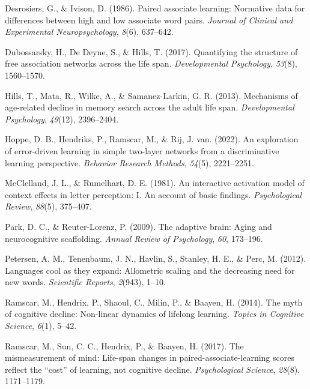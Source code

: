 \documentclass[
  man]{apa6}
\newlength{\cslhangindent}
\newlength{\cslentryspacingunit} %
\newenvironment{CSLReferences}[2] %
 {%
  \setlength{\parindent}{0pt}
  \ifodd #1
  \let\oldpar\par
  \def\par{\hangindent=\cslhangindent\oldpar}
  \fi
  \setlength{\parskip}{#2\cslentryspacingunit}
 }%
 {}
\begin{document}
\begin{CSLReferences}{1}{0}
\leavevmode{}%
Desrosiers, G., \& Ivison, D. (1986). Paired associate learning: Normative data for differences between high and low associate word pairs. \emph{Journal of Clinical and Experimental Neuropsychology}, \emph{8}(6), 637--642.

\leavevmode{}%
Dubossarsky, H., De Deyne, S., \& Hills, T. (2017). Quantifying the structure of free association networks across the life span. \emph{Developmental Psychology}, \emph{53}(8), 1560--1570.

\leavevmode{}%
Hills, T., Mata, R., Wilke, A., \& Samanez-Larkin, G. R. (2013). Mechanisms of age-related decline in memory search across the adult life span. \emph{Developmental Psychology}, \emph{49}(12), 2396--2404.

\leavevmode{}%
Hoppe, D. B., Hendriks, P., Ramscar, M., \& Rij, J. van. (2022). An exploration of error-driven learning in simple two-layer networks from a discriminative learning perspective. \emph{Behavior Research Methods}, \emph{54}(5), 2221--2251.

\leavevmode{}%
McClelland, J. L., \& Rumelhart, D. E. (1981). An interactive activation model of context effects in letter perception: I. An account of basic findings. \emph{Psychological Review}, \emph{88}(5), 375--407.

\leavevmode{}%
Park, D. C., \& Reuter-Lorenz, P. (2009). The adaptive brain: Aging and neurocognitive scaffolding. \emph{Annual Review of Psychology}, \emph{60}, 173--196.

\leavevmode{}%
Petersen, A. M., Tenenbaum, J. N., Havlin, S., Stanley, H. E., \& Perc, M. (2012). Languages cool as they expand: Allometric scaling and the decreasing need for new words. \emph{Scientific Reports}, \emph{2}(943), 1--10.

\leavevmode{}%
Ramscar, M., Hendrix, P., Shaoul, C., Milin, P., \& Baayen, H. (2014). The myth of cognitive decline: Non-linear dynamics of lifelong learning. \emph{Topics in Cognitive Science}, \emph{6}(1), 5--42.

\leavevmode{}%
Ramscar, M., Sun, C. C., Hendrix, P., \& Baayen, H. (2017). The mismeasurement of mind: Life-span changes in paired-associate-learning scores reflect the {``cost''} of learning, not cognitive decline. \emph{Psychological Science}, \emph{28}(8), 1171--1179.


\end{CSLReferences}
\end{document}
